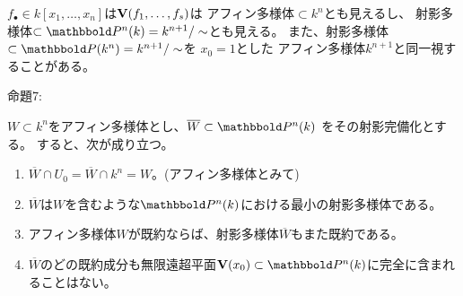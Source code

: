 $f_\bullet \in k[x_1,\dots,x_n]$は$\textbf V(f_1,\dots,f_s)$は
アフィン多様体$\subset k^n$とも見えるし、
射影多様体$\subset \P^n(k) = k^{n+1}/\sim$とも見える。
また、射影多様体$\subset \P(k^n) = k^{n+1}/\sim$を
$x_0=1$とした
アフィン多様体$k^{n+1}$と同一視することがある。
\begin{framed}
  命題7:

  $W\subset k^n$をアフィン多様体とし、$\overline W \subset \P^n(k)$
  をその射影完備化とする。  
  すると、次が成り立つ。
  \begin{enumerate}[label=(\roman*)]
    \item $\overline W \cap U_0 = \overline W \cap k^n = W$。(アフィン多様体とみて)
    \item
    $\overline W$は$W$を含むような$\P^n(k)$における最小の射影多様体である。
    \item
    アフィン多様体$W$が既約ならば、射影多様体$\overline W$もまた既約である。
    \item
    $\overline W$のどの既約成分も無限遠超平面$\var(x_0) \subset \P^n(k)$に完全に含まれることはない。
  \end{enumerate}
\end{framed}
